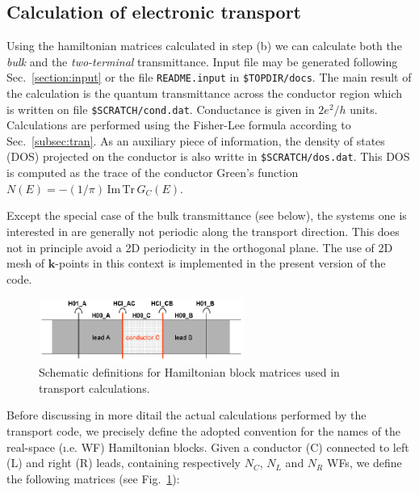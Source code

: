 
\subsection {Calculation of electronic transport}
\label{subsection:transport}

Using the hamiltonian matrices calculated in step (b) we can
calculate both the {\em bulk} and the {\em two-terminal} transmittance.
Input file may be generated following Sec.~\ref{section:input}
or the file {\tt README.input} in {\tt \$TOPDIR/docs}. The main result of the 
calculation is the quantum transmittance across the conductor region
which is written on file {\tt \$SCRATCH/cond.dat}. Conductance is given
in $2e^2/h$ units. Calculations are performed using the Fisher-Lee formula
according to Sec.~\ref{subsec:tran}.
As an auxiliary piece of information, the density of states (DOS) projected on
the conductor is also writte in {\tt \$SCRATCH/dos.dat}.
This DOS is computed as the trace of the conductor Green's function
$ N(E) = -(1/\pi)\, \text{Im} \, \text{Tr}\, G_C(E)$.

Except the special case of the bulk transmittance (see below), the systems one is
interested in are generally not periodic along the transport direction. This does not
in principle avoid a 2D periodicity in the orthogonal plane. The use of 
2D mesh of $\mathbf{k}$-points in this context is implemented in the present 
version of the code.  \\

%
%
\begin{figure}
   \centering
   \includegraphics[clip,width=0.6\textwidth]{acb}
   \caption{Schematic definitions for Hamiltonian block matrices used in 
	    transport calculations. \label{fig:matrix_naming}}
\end{figure}
%
%
\noindent 
Before discussing in more ditail the actual calculations performed by
the transport code, we precisely define the adopted convention for the
names of the real-space ({\i.e.} WF) Hamiltonian blocks.  
Given a conductor (C) connected to left (L) and right (R) leads, containing
respectively $N_C$, $N_L$ and $N_R$ WFs, 
we define the following matrices (see Fig.~\ref{fig:matrix_naming}): \\

